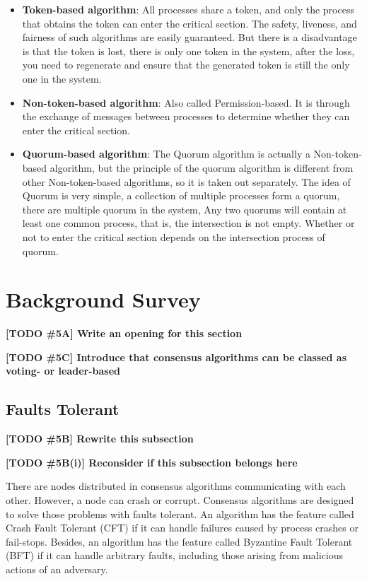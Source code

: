 \documentclass[12pt, a4paper]{article}
\newcommand{\todo}[2]{\textbf{\color{blue}[TODO \##1] #2}\par}
\begin{document}
\begin{itemize}
  \item \textbf{Token-based algorithm}: All processes share a token, and only the
  process that obtains the token can enter the critical section. The safety,
  liveness, and fairness of such algorithms are easily guaranteed. But there is
  a disadvantage is that the token is lost, there is only one token in the
  system, after the loss, you need to regenerate and ensure that the generated
  token is still the only one in the system.
  \item \textbf{Non-token-based algorithm}: Also called Permission-based. It is
  through the exchange of messages between processes to determine whether they
  can enter the critical section.
  \item \textbf{Quorum-based algorithm}: The Quorum algorithm is actually a
  Non-token-based algorithm, but the principle of the quorum algorithm is
  different from other Non-token-based algorithms, so it is taken out
  separately. The idea of Quorum is very simple, a collection of multiple
  processes form a quorum, there are multiple quorum in the system, Any two
  quorums will contain at least one common process, that is, the intersection
  is not empty. Whether or not to enter the critical section depends on the
  intersection process of quorum.
\end{itemize}


\section{Background Survey}

\todo{5A}{Write an opening for this section}
\todo{5C}{Introduce that consensus algorithms can be classed as voting- or leader-based}

\subsection{Faults Tolerant}
\todo{5B}{Rewrite this subsection}
\todo{5B(i)}{Reconsider if this subsection belongs here}
There are nodes distributed in consensus algorithms communicating with each other.
However, a node can crash or corrupt. Consensus algorithms are designed
to solve those problems with faults tolerant.
An algorithm has the feature called Crash Fault Tolerant (CFT)
if it can handle failures caused by process crashes or fail-stops.
Besides, an algorithm has the feature called Byzantine Fault Tolerant (BFT)
if it can handle arbitrary faults,
including those arising from malicious actions of an adversary.
\end{document}
